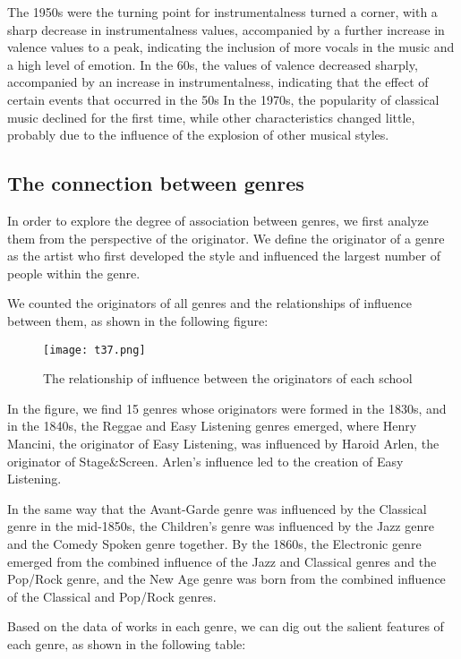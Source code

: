 \documentclass[12pt]{article}  %
\begin{document}
The 1950s were the turning point for instrumentalness turned a corner, with a sharp decrease in instrumentalness values, accompanied by a further increase in valence values to a peak, indicating the inclusion of more vocals in the music and a high level of emotion. In the 60s, the values of valence decreased sharply, accompanied by an increase in instrumentalness, indicating that the effect of certain events that occurred in the 50s In the 1970s, the popularity of classical music declined for the first time, while other characteristics changed little, probably due to the influence of the explosion of other musical styles. 

\subsection{The connection between genres}
In order to explore the degree of association between genres, we first analyze them from the perspective of the originator. We define the originator of a genre as the artist who first developed the style and influenced the largest number of people within the genre.

We counted the originators of all genres and the relationships of influence between them, as shown in the following figure:

\begin{figure}[H]
	\centering
	\texttt{[image: t37.png]} 	%
	\caption{The relationship of influence between the originators of each school}		%
	\label{fig:ex4-9}
\end{figure}

In the figure, we find 15 genres whose originators were formed in the 1830s, and in the 1840s, the Reggae and Easy Listening genres emerged, where Henry Mancini, the originator of Easy Listening, was influenced by Haroid Arlen, the originator of Stage\&Screen. Arlen's influence led to the creation of Easy Listening.

In the same way that the Avant-Garde genre was influenced by the Classical genre in the mid-1850s, the Children's genre was influenced by the Jazz genre and the Comedy Spoken genre together. By the 1860s, the Electronic genre emerged from the combined influence of the Jazz and Classical genres and the Pop/Rock genre, and the New Age genre was born from the combined influence of the Classical and Pop/Rock genres.

Based on the data of works in each genre, we can dig out the salient features of each genre, as shown in the following table:
\end{document}
